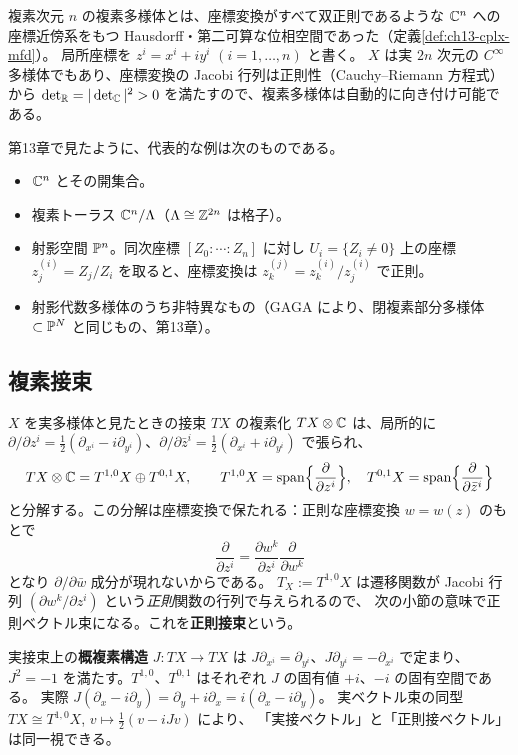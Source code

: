 複素次元 $n$ の複素多様体とは、座標変換がすべて双正則であるような $\mathbb{C}^n$ への座標近傍系をもつ Hausdorff・第二可算な位相空間であった（定義\ref{def:ch13-cplx-mfd}）。
局所座標を $z^i = x^i + i y^i$ $(i=1,\dots,n)$ と書く。
$X$ は実 $2n$ 次元の $C^\infty$ 多様体でもあり、座標変換の Jacobi 行列は正則性（Cauchy--Riemann 方程式）から
$\det_{\mathbb{R}} = |\det_{\mathbb{C}}|^2 > 0$ を満たすので、複素多様体は自動的に向き付け可能である。

第13章で見たように、代表的な例は次のものである。
\begin{itemize}
\item $\mathbb{C}^n$ とその開集合。
\item 複素トーラス $\mathbb{C}^n/\Lambda$（$\Lambda \cong \mathbb{Z}^{2n}$ は格子）。
\item 射影空間 $\mathbb{P}^n$。同次座標 $[Z_0:\cdots:Z_n]$ に対し $U_i=\{Z_i\neq 0\}$ 上の座標 $z^{(i)}_j = Z_j/Z_i$ を取ると、座標変換は $z^{(j)}_k = z^{(i)}_k / z^{(i)}_j$ で正則。
\item 射影代数多様体のうち非特異なもの（GAGA により、閉複素部分多様体 $\subset\mathbb{P}^N$ と同じもの、第13章）。
\end{itemize}

\subsection{複素接束}

$X$ を実多様体と見たときの接束 $TX$ の複素化 $TX\otimes\mathbb{C}$ は、局所的に
$\partial/\partial z^i = \frac12(\partial_{x^i} - i\partial_{y^i})$、$\partial/\partial\bar z^{i} = \frac12(\partial_{x^i} + i\partial_{y^i})$
で張られ、
\[
TX\otimes \mathbb{C} = T^{1,0}X \oplus T^{0,1}X,\qquad
T^{1,0}X = \mathrm{span}\Big\{\frac{\partial}{\partial z^i}\Big\},\quad
T^{0,1}X = \mathrm{span}\Big\{\frac{\partial}{\partial \bar z^{i}}\Big\}
\]
と分解する。この分解は座標変換で保たれる：正則な座標変換 $w = w(z)$ のもとで
\[
\frac{\partial}{\partial z^i} = \frac{\partial w^k}{\partial z^i}\frac{\partial}{\partial w^k}
\]
となり $\partial/\partial\bar w$ 成分が現れないからである。
$T_X := T^{1,0}X$ は遷移関数が Jacobi 行列 $(\partial w^k/\partial z^i)$ という\emph{正則}関数の行列で与えられるので、
次の小節の意味で正則ベクトル束になる。これを\textbf{正則接束}という。

実接束上の\textbf{概複素構造} $J : TX\to TX$ は $J\partial_{x^i} = \partial_{y^i}$、$J\partial_{y^i} = -\partial_{x^i}$ で定まり、
$J^2 = -1$ を満たす。$T^{1,0}$、$T^{0,1}$ はそれぞれ $J$ の固有値 $+i$、$-i$ の固有空間である。
実際 $J(\partial_x - i\partial_y) = \partial_y + i\partial_x = i(\partial_x - i\partial_y)$。
実ベクトル束の同型 $TX \cong T^{1,0}X$, $v\mapsto \frac12(v - iJv)$ により、
「実接ベクトル」と「正則接ベクトル」は同一視できる。

